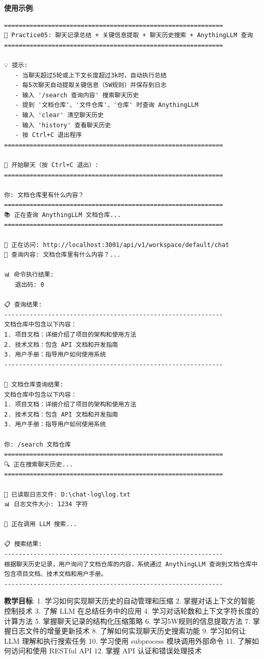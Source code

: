 \documentclass[]{article}
\begin{document}
\textbf{使用示例}:

\begin{verbatim}
============================================================
🚀 Practice05: 聊天记录总结 + 关键信息提取 + 聊天历史搜索 + AnythingLLM 查询
============================================================

💡 提示:
   - 当聊天超过5轮或上下文长度超过3k时，自动执行总结
   - 每5次聊天自动提取关键信息（5W规则）并保存到日志
   - 输入 '/search 查询内容' 搜索聊天历史
   - 提到 '文档仓库'、'文件仓库'、'仓库' 时查询 AnythingLLM
   - 输入 'clear' 清空聊天历史
   - 输入 'history' 查看聊天历史
   - 按 Ctrl+C 退出程序
============================================================

💬 开始聊天（按 Ctrl+C 退出）:
============================================================

你: 文档仓库里有什么内容？
============================================================
📚 正在查询 AnythingLLM 文档仓库...
============================================================

📡 正在访问: http://localhost:3001/api/v1/workspace/default/chat
💬 查询内容: 文档仓库里有什么内容？...

📊 命令执行结果:
   退出码: 0

📋 查询结果:
------------------------------------------------------------
文档仓库中包含以下内容：
1. 项目文档：详细介绍了项目的架构和使用方法
2. 技术文档：包含 API 文档和开发指南
3. 用户手册：指导用户如何使用系统
------------------------------------------------------------

🤖 文档仓库查询结果:
文档仓库中包含以下内容：
1. 项目文档：详细介绍了项目的架构和使用方法
2. 技术文档：包含 API 文档和开发指南
3. 用户手册：指导用户如何使用系统

你: /search 文档仓库
============================================================
🔍 正在搜索聊天历史...
============================================================

📂 已读取日志文件: D:\chat-log\log.txt
📊 日志文件大小: 1234 字符

🤖 正在调用 LLM 搜索...

📋 搜索结果:
------------------------------------------------------------
根据聊天历史记录，用户询问了文档仓库的内容，系统通过 AnythingLLM 查询到文档仓库中包含项目文档、技术文档和用户手册。
------------------------------------------------------------
\end{verbatim}

\textbf{教学目标}: 1. 学习如何实现聊天历史的自动管理和压缩 2.
掌握对话上下文的智能控制技术 3. 了解 LLM 在总结任务中的应用 4.
学习对话轮数和上下文字符长度的计算方法 5. 掌握聊天记录的结构化压缩策略
6. 学习5W规则的信息提取方法 7. 掌握日志文件的增量更新技术 8.
了解如何实现聊天历史搜索功能 9. 学习如何让 LLM 理解和执行搜索任务 10.
学习使用 subprocess 模块调用外部命令 11. 了解如何访问和使用 RESTful API
12. 掌握 API 认证和错误处理技术
\end{document}
